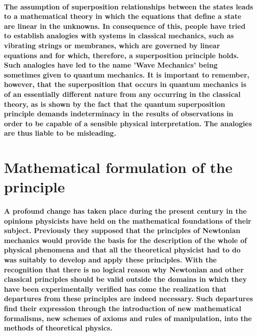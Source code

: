 \documentclass[10pt, kindle, oneside]{kindle}
\begin{document}
\paragraph{The assumption of superposition relationships between the states leads to a mathematical theory in which the equations that define a state are linear in the unknowns. In consequence of this, people have tried to establish analogies with systems in classical mechanics, such as vibrating strings or membranes, which are governed by linear equations and for which, therefore, a superposition principle holds. Such analogies have led to the name 'Wave Mechanics' being sometimes given to quantum mechanics. It is important to remember, however, that the superposition that occurs in quantum mechanics is of an essentially different nature from any occurring in the classical theory, as is shown by the fact that the quantum superposition principle demands indeterminacy in the results of observations in order to be capable of a sensible physical interpretation. The analogies are thus liable to be misleading.}
\section{Mathematical formulation of the principle}
\paragraph{A profound change has taken place during the present century in the opinions physicists have held on the mathematical foundations of their subject. Previously they supposed that the principles of Newtonian mechanics would provide the basis for the description of the whole of physical phenomena and that all the theoretical physicist had to do was suitably to develop and apply these principles. With the recognition that there is no logical reason why Newtonian and other classical principles should be valid outside the domains in which they have been experimentally verified has come the realization that departures from these principles are indeed necessary. Such departures find their expression through the introduction of new mathematical formalisms, new schemes of axioms and rules of manipulation, into the methods of theoretical physics.}
\end{document}
